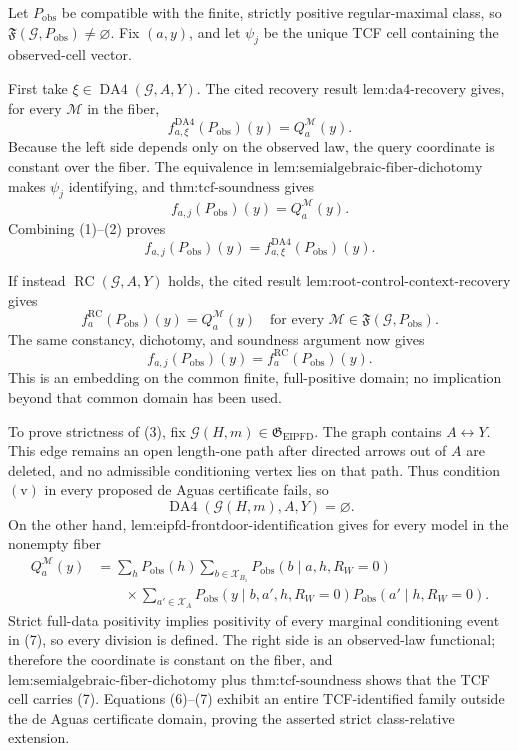 Let \(P_{\mathrm{obs}}\) be compatible with the finite, strictly positive regular-maximal class, so \(\mathfrak F(\mathcal G,P_{\mathrm{obs}})\neq\varnothing\).  Fix \((a,y)\), and let \(\psi_j\) be the unique TCF cell containing the observed-cell vector.

First take \(\xi\in\operatorname{DA4}(\mathcal G,A,Y)\).  The cited recovery result \(\text{lem:da4-recovery}\) gives, for every \(\mathcal M\) in the fiber,
\[
f^{\mathrm{DA4}}_{a,\xi}(P_{\mathrm{obs}})(y)
=Q_a^{\mathcal M}(y).
\tag{1}
\]
Because the left side depends only on the observed law, the query coordinate is constant over the fiber.  The equivalence in \(\text{lem:semialgebraic-fiber-dichotomy}\) makes \(\psi_j\) identifying, and \(\text{thm:tcf-soundness}\) gives
\[
f_{a,j}(P_{\mathrm{obs}})(y)=Q_a^{\mathcal M}(y).
\tag{2}
\]
Combining (1)--(2) proves
\[
f_{a,j}(P_{\mathrm{obs}})(y)
=f^{\mathrm{DA4}}_{a,\xi}(P_{\mathrm{obs}})(y).
\tag{3}
\]

If instead \(\operatorname{RC}(\mathcal G,A,Y)\) holds, the cited result \(\text{lem:root-control-context-recovery}\) gives
\[
f_a^{\mathrm{RC}}(P_{\mathrm{obs}})(y)=Q_a^{\mathcal M}(y)
\quad\text{for every }\mathcal M\in\mathfrak F(\mathcal G,P_{\mathrm{obs}}).
\tag{4}
\]
The same constancy, dichotomy, and soundness argument now gives
\[
f_{a,j}(P_{\mathrm{obs}})(y)=f_a^{\mathrm{RC}}(P_{\mathrm{obs}})(y).
\tag{5}
\]
This is an embedding on the common finite, full-positive domain; no implication beyond that common domain has been used.

To prove strictness of (3), fix \(\mathcal G(H,m)\in\mathfrak G_{\mathrm{EIPFD}}\).  The graph contains \(A\leftrightarrow Y\).  This edge remains an open length-one path after directed arrows out of \(A\) are deleted, and no admissible conditioning vertex lies on that path.  Thus condition \(\mathrm{(v)}\) in every proposed de Aguas certificate fails, so
\[
\operatorname{DA4}(\mathcal G(H,m),A,Y)=\varnothing.
\tag{6}
\]
On the other hand, \(\text{lem:eipfd-frontdoor-identification}\) gives for every model in the nonempty fiber
\[
\begin{aligned}
Q_a^{\mathcal M}(y)
&=\sum_hP_{\mathrm{obs}}(h)
\sum_{b\in\mathcal X_{B_1}}P_{\mathrm{obs}}(b\mid a,h,R_W=0)\\
&\qquad\times\sum_{a'\in\mathcal X_A}
P_{\mathrm{obs}}(y\mid b,a',h,R_W=0)
P_{\mathrm{obs}}(a'\mid h,R_W=0).
\end{aligned}
\tag{7}
\]
Strict full-data positivity implies positivity of every marginal conditioning event in (7), so every division is defined.  The right side is an observed-law functional; therefore the coordinate is constant on the fiber, and \(\text{lem:semialgebraic-fiber-dichotomy}\) plus \(\text{thm:tcf-soundness}\) shows that the TCF cell carries (7).  Equations (6)--(7) exhibit an entire TCF-identified family outside the de Aguas certificate domain, proving the asserted strict class-relative extension.

